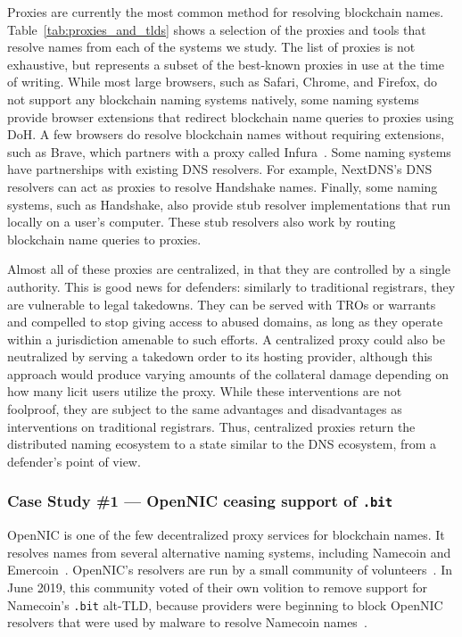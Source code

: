Proxies are currently the most common method for resolving 
blockchain names. Table~\ref{tab:proxies_and_tlds} shows a 
selection of the proxies and tools that resolve names from 
each of the systems we study. The list of proxies is not 
exhaustive, but represents 
a subset of the best-known proxies in use at the time of 
writing. While most large 
browsers, such as Safari, Chrome, and Firefox, do not support 
any blockchain naming systems natively, some naming systems 
provide browser extensions that redirect blockchain name 
queries to proxies using DoH. A few browsers do resolve 
blockchain names without requiring extensions, such as Brave, 
which partners with a proxy called 
Infura~\cite{brave_uses_infura}. Some naming systems have 
partnerships with existing DNS resolvers. For example, 
NextDNS's DNS resolvers can act as proxies to resolve 
Handshake names. Finally, some naming systems, such as 
Handshake, also provide stub resolver implementations that 
run locally on a user's computer. These stub resolvers also 
work by routing blockchain name queries to proxies.

Almost all of these proxies are centralized, in that they 
are controlled by a single authority. This is good 
news for defenders: similarly to traditional registrars, they 
are vulnerable to legal takedowns. They can be served with 
TROs or warrants and compelled to stop giving access to 
abused domains, as long as they operate within a jurisdiction 
amenable to such efforts. A centralized proxy could also be 
neutralized by serving a takedown order to its 
hosting provider, although this approach would produce 
varying amounts of the collateral damage depending on how 
many licit users utilize the proxy. 
While these interventions are not 
foolproof, they are subject to the same advantages and 
disadvantages as interventions on traditional registrars. 
Thus, centralized proxies return the distributed naming 
ecosystem to a state similar to the DNS ecosystem, from a 
defender's point of view. 

\subsubsection{Case Study \#1 --- OpenNIC ceasing support of \texttt{.bit}}

OpenNIC is one of the few decentralized proxy services for 
blockchain names. It resolves names from several alternative 
naming systems, including Namecoin and 
Emercoin~\cite{opennic}. OpenNIC's 
resolvers are run by a small community of 
volunteers~\cite{opennic_servers}. In June 2019, this 
community voted of their own volition to remove support for 
Namecoin's \texttt{.bit} alt-TLD, because providers were 
beginning to block OpenNIC resolvers that were used by 
malware to resolve Namecoin 
names~\cite{opennic_namecoin_vote}.

